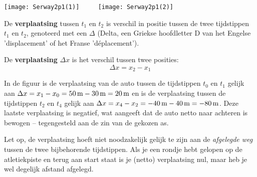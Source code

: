 \documentclass{ximera}
\begin{document}
	\begin{image}
	\texttt{[image: Serway2p1(1)]}
	$\qquad$   %
	\texttt{[image: Serway2p1(2)]}
	\end{image}
	
	De \textbf{verplaatsing} tussen $t_1$ en $t_2$ is verschil in positie tussen de twee tijdstippen $t_1$ en $t_2$, genoteerd met een $\Delta$ (Delta, een Griekse hoofdletter D  van het Engelse 'displacement' of het Franse 'déplacement').

	\begin{definition}
	De \textbf{verplaatsing} \(\Delta x\) is het verschil tussen twee posities:
	\[
		\Delta x = x_2-x_1
	\]
	\end{definition}

	In de figuur is de verplaatsing van de auto tussen de tijdstippen $t_0$ en $t_1$ gelijk aan $\Delta x = x_1-x_0=50\rm\,m-30\rm\,m=20\rm\,m$ en is de verplaatsing tussen de tijdstippen $t_2$ en $t_4$ gelijk aan $\Delta x=x_4-x_2=-40\rm\,m-40\rm\,m=-80\rm\,m$. Deze laatste verplaatsing is negatief, wat aangeeft dat de auto netto naar achteren is bewogen -- tegengesteld aan de zin van de gekozen as.

Let op, de verplaatsing hoeft niet noodzakelijk gelijk te zijn aan de \emph{afgelegde weg} tussen de twee bijbehorende tijdstippen. Als je een rondje hebt gelopen op de atletiekpiste en terug aan start staat is je (netto) verplaatsing nul, maar heb je wel degelijk afstand afgelegd.

	
\end{document}
